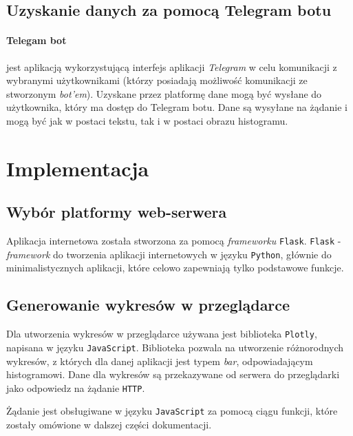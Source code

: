 \documentclass[a4paper]{article}
\begin{document}
\subsection{Uzyskanie danych za pomocą Telegram botu}

\paragraph{Telegam bot} jest aplikacją wykorzystującą interfejs aplikacji \textit{Telegram}
w celu komunikacji z wybranymi użytkownikami (którzy posiadają możliwość komunikacji ze stworzonym
\textit{bot'em}).\newline
Uzyskane przez platformę dane mogą być wysłane do użytkownika, który ma dostęp do Telegram botu. Dane są wysyłane na żądanie i mogą być jak w postaci tekstu, tak i w postaci obrazu histogramu.



\section{Implementacja}
       
        
        \subsection{Wybór platformy web-serwera}
	Aplikacja internetowa została stworzona za pomocą \textsl{frameworku} \texttt{Flask}. 
	\texttt{Flask} - \textsl{framework} do tworzenia aplikacji internetowych w języku \texttt{Python}, głównie do
	minimalistycznych aplikacji, które celowo zapewniają tylko podstawowe funkcje.
	
    \subsection{Generowanie wykresów w przeglądarce}
	Dla utworzenia wykresów w przeglądarce używana jest biblioteka \texttt{Plotly}, napisana w języku \texttt{JavaScript}.
	Biblioteka pozwala na utworzenie różnorodnych wykresów, z których dla danej aplikacji jest typem \textsl{bar}, odpowiadającym histogramowi. 
	Dane dla wykresów są przekazywane od serwera do przeglądarki jako odpowiedz na żądanie \texttt{HTTP}.

	Żądanie jest obsługiwane w języku \texttt{JavaScript} za pomocą ciągu funkcji, które zostały omówione w dalszej części dokumentacji.
\end{document}
